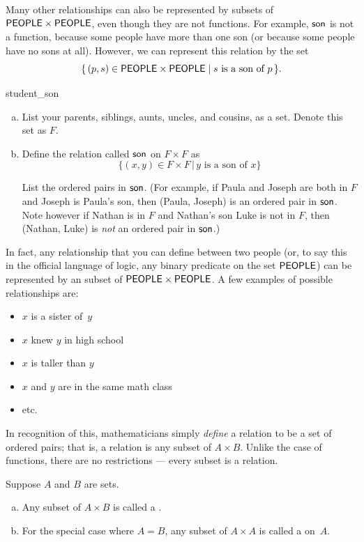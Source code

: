 Many other relationships can also be represented by subsets of $\sf{PEOPLE} \times \sf{PEOPLE}$, even though they are not functions. For example, $\sf{son}$ is not a function, because some people have more than one son (or because some people have no sons at all). However, we can represent this relation by the set
	$$ \{\, (p,s) \in  \sf{PEOPLE} \times \sf{PEOPLE} \mid \text{$s$ is a son of~$p$} \,\} .$$
	
\begin{exercise}{student_son}
\begin{enumerate}[(a)]
\item
List your parents, siblings, aunts, uncles, and cousins, as a set.  Denote this set as $F$.
\item
Define the relation called $\sf{son}$ on $F \times F$ as
\[
\{ (x,y) \in F \times F \,|\, y \text{ is a son of } x \} \]

\noindent
List the ordered pairs in $\sf{son}$. (For example, if Paula and Joseph are both in $F$ and Joseph is Paula's son, then (Paula, Joseph) is an ordered pair in $\sf{son}$.  Note however if Nathan is in $F$ and Nathan's son Luke is not in $F$, then (Nathan, Luke) is \emph{not} an ordered pair in $\sf{son}$.)
\end{enumerate}
\end{exercise}
	
In fact, any relationship that you can define between two people (or, to say this in the official language of logic, any binary predicate on the set $\sf{PEOPLE}$) can be represented by an subset of $\sf{PEOPLE} \times \sf{PEOPLE}$. A few examples of possible relationships are:
	\begin{itemize}
	\item $x$ is a sister of~$y$
	\item $x$ knew $y$ in high school
	\item $x$ is taller than $y$
	\item $x$ and $y$ are in the same math class
	\item etc.
	\end{itemize}
In recognition of this, mathematicians simply \emph{define} a relation to be a set of ordered pairs; that is, a relation is any subset of $A \times B$. Unlike the case of functions, there are no restrictions --- every subset is a relation.


\begin{defn} \label{relation}  Suppose $A$ and $B$ are sets. 
\begin{enumerate}[(a)]
\item Any subset of $A \times B$ is called a .
\item For the special case where $A = B$, any subset of $A \times A$ is called a   on~$A$.
\end{enumerate}
\end{defn}

